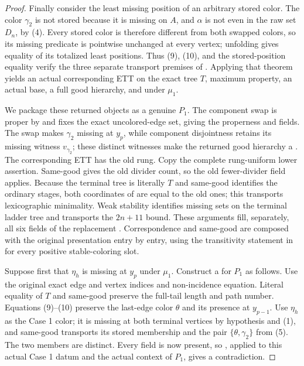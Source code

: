 \begin{proof}
Finally consider the least missing position of an arbitrary stored color.
The color \(\gamma_2\) is not stored because it is missing on \(A\), and
\(\alpha\) is not even in the raw set \(D_n\), by (4).  Every stored
color is therefore different from both swapped colors, so its missing
predicate is pointwise unchanged at every vertex; unfolding
 gives equality of its totalized
least positions.  Thus (9), (10), and the stored-position equality verify
the three separate transport premises of
.  Applying that theorem yields
an actual corresponding ETT on the exact tree \(T\), maximum property, an
actual base, a full good hierarchy, and
 under \(\mu_1\).

We package these returned objects as a genuine
 \(P_1\).  The component swap
is proper by  and fixes the exact
uncolored-edge set, giving the properness and
 fields.  The swap makes \(\gamma_2\) missing
at \(y_p\), while component disjointness retains its missing witness
\(v_{\gamma_2}\); these distinct witnesses make the returned good
hierarchy a .  The corresponding ETT has
the old rung.  Copy the complete rung-uniform lower assertion.  Same-good
gives the old divider count, so the old fewer-divider field applies.
Because the terminal tree is literally \(T\) and same-good identifies the
ordinary stages, both coordinates of
 are equal to the old ones; this
transports lexicographic minimality.  Weak stability identifies missing
sets on the terminal ladder tree and transports the \(2n+11\) bound.
These arguments fill, separately, all six fields of the replacement
.  Correspondence and
same-good are composed with the original presentation entry by entry,
using the transitivity statement in  for every positive
stable-coloring slot.

Suppose first that \(\eta_h\) is missing at \(y_p\) under \(\mu_1\).
Construct a  for \(P_1\) as
follows.  Use the original exact edge and vertex indices and non-incidence
equation.  Literal equality of \(T\) and same-good preserve the full-tail
length and path number.  Equations (9)--(10) preserve the last-edge color
\(\theta\) and its presence at \(y_{p-1}\).  Use \(\eta_h\) as the Case
1 color; it is missing at both terminal vertices by hypothesis and (1),
and same-good transports its stored membership and the pair
\(\{\theta,\gamma_2\}\) from (5).  The two members are distinct.  Every
field is now present, so
, applied to this actual Case
1 datum and the actual context of \(P_1\), gives a contradiction.


\end{proof}
